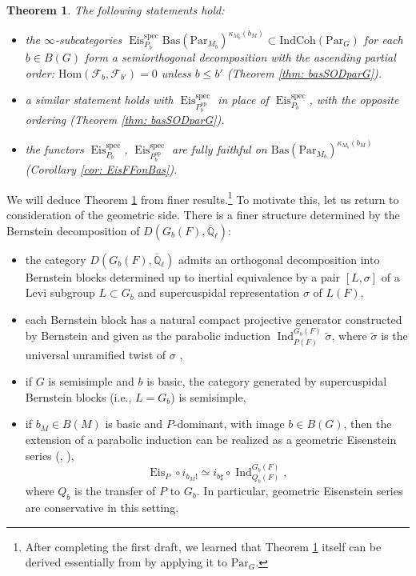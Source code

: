 \documentclass{amsart}
\newtheorem{theorem}{Theorem}[subsection]
\theoremstyle{definition}
\theoremstyle{remark}
\numberwithin{equation}{section}
\DeclareMathOperator{\Ind}{Ind}
\newcommand{\ov}{\overline}
\newcommand{\mc}{\mathcal}
\newcommand{\Q}{\mathbb{Q}}
\newcommand{\Hom}{\mathrm{Hom}}
\newcommand{\spec}{\mathrm{spec}}
\newcommand{\op}{\mathrm{op}}
\newcommand{\Par}{\mathrm{Par}}
\newcommand{\IndCoh}{\mathrm{IndCoh}}
\DeclareMathOperator{\Eis}{\mathrm{Eis}}
\newcommand{\Bas}{\mathrm{Bas}}
\begin{document}
\begin{theorem}\label{thm:IntroI}
The following statements hold:
\begin{itemize}
    \item the $\infty$-subcategories $\Eis^\spec_{P_b} \Bas(\Par_{M_b})^{\kappa_{M_b}(b_M)} \subset \IndCoh(\Par_G)$ for each $b \in B(G)$ form a semiorthogonal decomposition with the ascending partial order: $\Hom(\mc{F}_{b}, \mc{F}_{b'}) = 0$ unless $b \leq b'$ (Theorem \ref{thm: basSODparG}).
    \item a similar statement holds with $\Eis^\spec_{P_b^\op}$ in place of $\Eis^\spec_{P_b}$, with the opposite ordering (Theorem \ref{thm: basSODparG}).
    \item the functors $\Eis^\spec_{P_b}$, $\Eis^\spec_{P_b^\op}$ are fully faithful on $\Bas(\Par_{M_b})^{\kappa_{M_b}(b_M)}$ (Corollary \ref{cor: EisFFonBas}).
\end{itemize}
\end{theorem}

We will deduce Theorem \ref{thm:IntroI} from finer results.\footnote{After completing the first draft, we learned that Theorem \ref{thm:IntroI} itself can be derived essentially from \cite{BuPadurariuToda} by applying it to $\Par_G$.} To motivate this, let us return to consideration of the geometric side. There is a finer structure determined by the Bernstein decomposition of  $D(G_b(F), \ov{\Q}_{\ell})$:
\begin{itemize}
    \item the category $D(G_b(F), \ov{\Q}_{\ell})$ admits an orthogonal decomposition into Bernstein blocks determined up to inertial equivalence by a pair $[L, \sigma]$ of a Levi subgroup $L \subset G_b$ and supercuspidal representation $\sigma$ of $L(F)$,
    \item each Bernstein block has a natural compact projective generator constructed by Bernstein and given as the parabolic induction $\Ind^{G_b (F)}_{P(F)} \widetilde{\sigma}$, where $\widetilde{\sigma}$ is the universal unramified twist of $\sigma$ \cite{BernsteinRumelhart},
    \item if $G$ is semisimple and $b$ is basic, the category generated by supercuspidal Bernstein blocks (i.e., $L=G_b$) is semisimple,
    \item if $b_M \in B(M)$ is basic and $P$-dominant, with image $b\in B(G)$, then the extension of a parabolic induction can be realized as a geometric Eisenstein series (\cite[Corollary 2.2.14]{HHS1}, \cite[proof of Lemma 2.4]{Takayasecondadjointness}),
    \begin{equation*}
        \Eis_{P} \circ i_{b_M !} \simeq i_{b \sharp} \circ \Ind^{G_b(F)}_{Q_b(F)},
    \end{equation*}
    where $Q_b$ is the transfer of $P$ to $G_b$.
    In particular, geometric Eisenstein series are conservative in this setting.  
\end{itemize}
\end{document}
